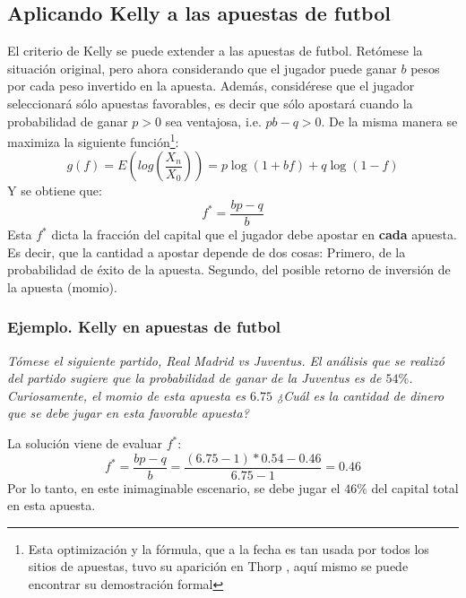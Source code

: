 \subsection{Aplicando Kelly a las apuestas de futbol} %
\label{subsection:aplicando_kelly_a_las_apuestas_de_futbol}

El criterio de Kelly se puede extender a las apuestas de futbol. Retómese la situación original, pero ahora considerando que el jugador puede ganar $b$ pesos por cada peso invertido en la apuesta. Además, considérese que el jugador seleccionará sólo apuestas favorables, es decir que sólo apostará cuando la probabilidad de ganar $p>0$ sea ventajosa, i.e. $pb - q > 0$.
De la misma manera se maximiza la siguiente función\footnote{Esta optimización y la fórmula, que a la fecha es tan usada por todos los sitios de apuestas, tuvo su aparición en  Thorp \cite{thorp1969optimal}, aquí mismo se puede encontrar su demostración formal}:
\[g(f) = E\left(log(\frac{X_n}{X_0})\right)=p\log(1+bf)+q\log(1-f)\]
Y se obtiene que:
\[f^* = \frac{bp -q}{b}\]
Esta $f^*$ dicta la fracción del capital que el jugador debe apostar en \textbf{cada} apuesta. Es decir, que la cantidad a apostar depende de dos cosas: Primero, de la probabilidad de éxito de la apuesta. Segundo, del posible retorno de inversión de la apuesta (momio).

\subsubsection{Ejemplo. Kelly en apuestas de futbol}

\emph{Tómese el siguiente partido, Real Madrid vs Juventus. El análisis que se realizó del partido sugiere que la probabilidad de ganar de la Juventus es de $54\%$. Curiosamente, el momio de esta apuesta es $6.75$
¿Cuál es la cantidad de dinero que se debe jugar en esta favorable apuesta?}\linebreak[2]


La solución viene de evaluar $f^*$:
\[f^* = \frac{bp -q}{b} = \frac{(6.75-1)*0.54 - 0.46}{6.75-1} = 0.46\]
Por lo tanto, en este inimaginable escenario, se debe jugar el $46\%$ del capital total en esta apuesta.
\linebreak[2]



